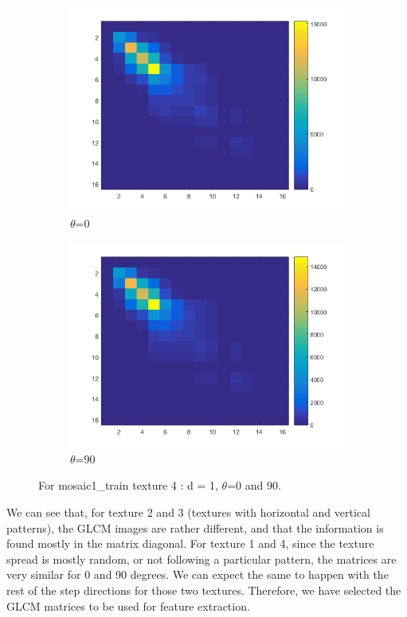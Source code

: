 \documentclass[a4paper, article, oneside, UKenglish]{memoir}
\newcommand{\0}{\mathbf{0}}
\newcommand{\1}{\mathbf{1}}
\begin{document}
\begin{figure}
  \centering
  \begin{subfigure}[b]{0.45\linewidth}
    \includegraphics[width=\linewidth]{./images/tx4-0.png}
    \caption{$\theta$=0}
  \end{subfigure}
  \begin{subfigure}[b]{0.45\linewidth}
    \includegraphics[width=\linewidth]{./images/tx4-90.png}
    \caption{$\theta$=90}
  \end{subfigure}
  \caption{For mosaic1\_train texture 4 : d = 1, $\theta$=0 and 90.}
  \label{fig:t4glcm}
\end{figure}

We can see that, for texture 2 and 3 (textures with horizontal and vertical patterns), the GLCM images are rather different, and that the information is found mostly in the matrix diagonal. For texture 1 and 4, since the texture spread is mostly random, or not following a particular pattern, the matrices are very similar for 0 and 90 degrees. We can expect the same to happen with the rest of the step directions for those two textures. Therefore, we have selected the GLCM matrices to be used for feature extraction. \\
\end{document}
